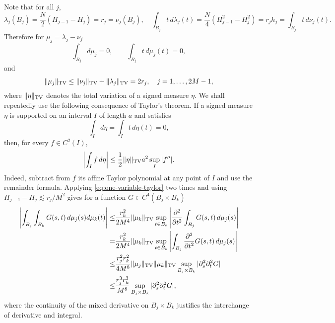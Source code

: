 \documentclass[11pt]{amsart}
\begin{document}
Note that for all $j$,
\[
 \lambda_j(B_j)=\frac N2(H_{j-1}-H_j)=r_j=\nu_j(B_j),\quad \int_{B_j}t\,d\lambda_j(t)
 =\frac N4(H_{j-1}^2-H_j^2)
 =r_jh_j= \int_{B_j}t\,d\nu_j(t).
\]
Therefore for $\mu_j=\lambda_j-\nu_j$
\begin{equation*}%
 \int_{B_j}d\mu_j=0,
 \qquad
 \int_{B_j}t\,d\mu_j(t)=0,
\end{equation*}
and
\begin{equation*}%
 \|\mu_j\|_{\rm TV}
 \le \|\nu_j\|_{\rm TV}+\|\lambda_j\|_{\rm TV}
 =2r_j,\quad j=1,\ldots,2M-1,
\end{equation*}
where $\|\eta\|_{\rm TV}$ denotes the total variation of a signed
measure $\eta$.
We shall repeatedly use the following consequence of Taylor's theorem. If
a signed measure $\eta$ is supported on an interval $I$ of length $a$ and
satisfies
\[
 \int_I d\eta=\int_I t\,d\eta(t)=0,
\]
then, for every $f\in C^2(I)$,
\begin{equation}\label{eq:one-variable-taylor}
 \left|\int_I f\,d\eta\right|
 \le \frac12\|\eta\|_{\rm TV}a^2\sup_I|f''|.        %
\end{equation}
Indeed, subtract from $f$ its affine Taylor polynomial at any point of
$I$ and use the remainder formula. Applying \eqref{eq:one-variable-taylor}
 two times and using $H_{j-1}-H_j\lesssim r_j/M^2$ gives for a function $G\in C^4(B_j\times B_k)$
\begin{align}
 \left|
 \int_{B_j}\int_{B_k}G(s,t)\,d\mu_j(s)d\mu_k(t)
 \right|
 \le& \frac{r_k^2}{2M^4}\|\mu_k\|_{\rm TV}\sup_{t\in B_k}\left|\frac{\partial^2}{\partial t^2}\int_{B_j}G(s,t)\,d\mu_j(s)\right|\label{eq:two-variable-taylor}\\
 \nonumber
  =& \frac{r_k^2}{2M^4}\|\mu_k\|_{\rm TV}\sup_{t\in B_k}\left|\int_{B_j}\frac{\partial^2}{\partial t^2}G(s,t)\,d\mu_j(s)\right|\\
  \nonumber
 \le&\frac{r_j^2r_k^2}{4M^8}\|\mu_j\|_{\rm TV}\|\mu_k\|_{\rm TV}
 \sup_{B_j\times B_k}|\partial_s^2\partial_t^2G|   \\
 \nonumber
 \le&\frac{r_j^3r_k^3}{M^8}
 \sup_{B_j\times B_k}|\partial_s^2\partial_t^2G|,
\end{align}
where the continuity of the mixed derivative on $B_j\times B_k$ justifies the interchange of derivative and integral.
\end{document}
